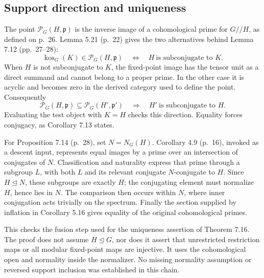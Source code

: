 \documentclass[10pt]{article}
\begin{document}
\subsection*{Support direction and uniqueness}
The point \(\mathcal P_G(H,\mathfrak p)\) is the inverse image of a cohomological prime for \(G/\!/H\), as defined on p. 26. Lemma 5.21 (p. 22) gives the two alternatives behind Lemma 7.12 (pp. 27–28): \[\operatorname{kos}_G(K)\in\mathcal P_G(H,\mathfrak p)
 \quad\Longleftrightarrow\quad
 H\ \text{is subconjugate to }K.\] When \(H\) is not subconjugate to \(K\), the fixed-point image has the tensor unit as a direct summand and cannot belong to a proper prime. In the other case it is acyclic and becomes zero in the derived category used to define the point. Consequently \[\mathcal P_G(H,\mathfrak p)\subseteq\mathcal P_G(H',\mathfrak p')
 \quad\Longrightarrow\quad H'\ \text{is subconjugate to }H.\] Evaluating the test object with \(K=H\) checks this direction. Equality forces conjugacy, as Corollary 7.13 states.\par
For Proposition 7.14 (p. 28), set \(N=N_G(H)\). Corollary 4.9 (p. 16), invoked as a descent input, represents equal images by a prime over an intersection of conjugates of \(N\). Classification and naturality express that prime through a subgroup \(L\), with both \(L\) and its relevant conjugate \(N\)-conjugate to \(H\). Since \(H\trianglelefteq N\), these subgroups are exactly \(H\); the conjugating element must normalize \(H\), hence lies in \(N\). The comparison then occurs within \(N\), where inner conjugation acts trivially on the spectrum. Finally the section supplied by inflation in Corollary 5.16 gives equality of the original cohomological primes.\par
This checks the fusion step used for the uniqueness assertion of Theorem 7.16. The proof does not assume \(H\trianglelefteq G\), nor does it assert that unrestricted restriction maps or all modular fixed-point maps are injective. It uses the cohomological open and normality inside the normalizer. No missing normality assumption or reversed support inclusion was established in this chain.\par
\end{document}
